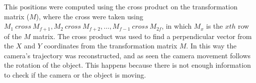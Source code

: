 \documentclass[12pt,a4paper]{article}
\begin{document}
This positions were computed using the cross product on the transformation matrix ($M$), where the cross were taken using $M_1 \ cross \ M_{f+1}, M_2 \ cross \ M_{f+2}, \dotso, M_{f-1} \ cross \ M_{2f}$, in which $M_x$ is the $xth$ row of the $M$ matrix. The cross product was used to find a perpendicular vector from the $X$ and $Y$ coordinates from the transformation matrix $M$. In this way the camera's trajectory was reconstructed, and as seen the camera movement follows the rotation of the object. This happens because there is not enough information to check if the camera or the object is moving. \\



 
\end{document}
